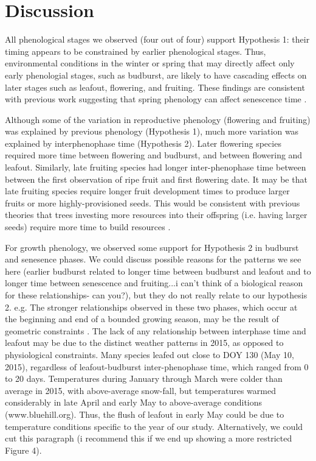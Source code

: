 \documentclass{article}
\begin{document}
\section* {Discussion}
\par All phenological stages we observed (four out of four) support Hypothesis 1: their timing appears to be constrained by earlier phenological stages. Thus, environmental conditions in the winter or spring that may directly affect only early phenologial stages, such as budburst, are likely to have cascading effects on later stages such as leafout, flowering, and fruiting. These findings are consistent with previous work suggesting that spring phenology can affect senescence time \citep {keenan2015}. 
\par Although some of the variation in reproductive phenology (flowering and fruiting) was explained by previous phenology (Hypothesis 1), much more variation was explained by interphenophase time (Hypothesis 2). Later flowering species required more time between flowering and budburst,
and between flowering and leafout. Similarly, late fruiting species had longer inter-phenophase time between between the first observation of ripe fruit and first flowering date. It may be that late fruiting species require longer fruit development times to produce larger fruits or more highly-provisioned seeds. This would be consistent with previous theories that trees investing more resources into their offspring (i.e. having larger seeds) require more time to build resources \citep {bolmgren2008,sun2011}.
\par For growth phenology, we observed some support for Hypothesis 2 in budburst and senesence phases. We could discuss possible reasons for the patterns we see here (earlier budburst related to longer time between budburst and leafout and to longer time between senescence and fruiting...i can't think of a biological reason for these relationships- can you?), but they do not really relate to our hypothesis 2.  e.g. The stronger relationships observed in these two phases, which occur at the beginning and end of a bounded growing season, may be the result of geometric constraints \citep{letten2013}. The lack of any relationship between interphase time and leafout may be due to the distinct weather patterns in 2015, as opposed to physiological constraints. Many species leafed out close to DOY 130 (May 10, 2015), regardless of leafout-budburst inter-phenophase time, which ranged from 0 to 20 days. Temperatures during January through March were colder than average in 2015, with above-average snow-fall, but temperatures warmed considerably in late April and early May to above-average conditions (www.bluehill.org). Thus, the flush of leafout in early May could be due to temperature conditions specific to the year of our study. Alternatively, we could cut this paragraph (i recommend this if we end up showing a more restricted Figure 4).
\end{document}
